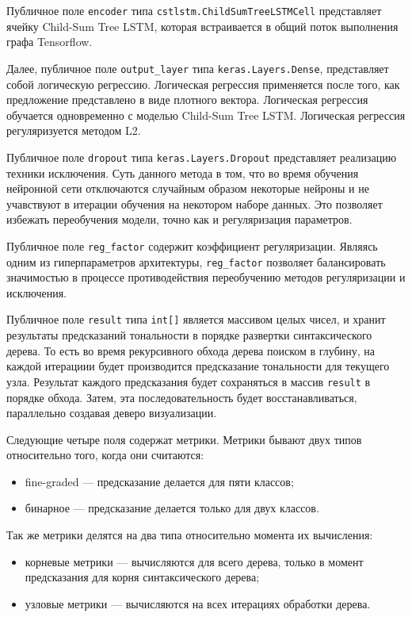 Публичное поле \texttt{encoder} типа \texttt{cstlstm.ChildSumTreeLSTMCell} представляет ячейку Child-Sum Tree LSTM, которая встраивается в общий поток выполнения графа Tensorflow.

Далее, публичное поле \texttt{output\_layer} типа \texttt{keras.Layers.Dense}, представляет собой логическую регрессию. Логическая регрессия применяется после того, как предложение представлено в виде плотного вектора. Логическая регрессия обучается одновременно с моделью Child-Sum Tree LSTM\@. Логическая регрессия регуляризуется методом L2.

Публичное поле \texttt{dropout} типа \texttt{keras.Layers.Dropout} представляет реализацию техники исключения. Суть данного метода в том, что во время обучения нейронной сети отключаются случайным образом некоторые нейроны и не учавствуют в итерации обучения на некотором наборе данных. Это позволяет избежать переобучения модели, точно как и регуляризация параметров.

Публичное поле \texttt{reg\_factor} содержит коэффициент регуляризации. Являясь одним из гиперпараметров архитектуры, \texttt{reg\_factor} позволяет балансировать значимостью в процессе противодействия переобучению методов регуляризации и исключения.

Публичное поле \texttt{result} типа \texttt{int[]} является массивом целых чисел, и хранит результаты предсказаний тональности в порядке развертки синтаксического дерева. То есть во время рекурсивного обхода дерева поиском в глубину, на каждой итерациии будет производится предсказание тональности для текущего узла. Результат каждого предсказания будет сохраняться в массив \texttt{result} в порядке обхода. Затем, эта последовательность будет восстанавливаться, параллельно создавая деверо визуализации.

Следующие четыре поля содержат метрики. Метрики бывают двух типов относительно того, когда они считаются:
\begin{itemize}
\item fine-graded --- предсказание делается для пяти классов;
\item бинарное --- предсказание делается только для двух классов.
\end{itemize}

Так же метрики делятся на два типа относительно момента их вычисления:
\begin{itemize}
\item корневые метрики --- вычисляются для всего дерева, только в момент предсказания для корня синтаксического дерева;
\item узловые метрики --- вычисляются на всех итерациях обработки дерева.
\end{itemize}

